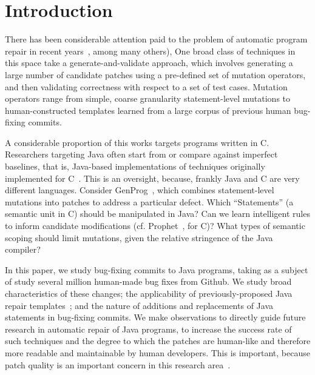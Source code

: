 \documentclass{sig-alternate-05-2015}
\begin{document}
\section{Introduction}

There has been considerable attention paid to the problem of automatic
program repair in recent
years~\cite{kim2013,legoues2012,pan2009,Weimer13, Qi13,
  Mechtaev15,prophet}, among many others),
%
One broad class of techniques in this space take a generate-and-validate
approach, which involves generating a large number of candidate patches using a
pre-defined set of mutation operators, and then validating correctness with
respect to a set of test cases.  Mutation operators range from simple, coarse
granularity statement-level mutations to human-constructed templates learned
from a large corpus of previous human bug-fixing commits.

A considerable proportion of this works targets programs written in C.
Researchers targeting Java often start from or compare against imperfect
baselines, that is, Java-based implementations of techniques originally
implemented for C~\cite{nopol,kim2013}. %
%
This is an oversight, because, frankly Java and C are very different languages.
Consider GenProg~\cite{legoues2012}, which
combines statement-level mutations into patches to address a particular
defect. Which ``Statements'' (a semantic unit in C) should be manipulated in Java?
Can we learn
intelligent rules to inform candidate modifications
(cf. Prophet~\cite{Long2016}, for C)?  What types of semantic scoping
should limit mutations, given the relative stringence of the Java
compiler?

In this paper, we study bug-fixing commits to Java programs, taking as a subject
of study several million human-made bug fixes from Github. We study broad
characteristics of these changes; the applicability of previously-proposed
Java repair templates~\cite{kim2013}; and the nature
of additions and replacements of Java statements in bug-fixing commits. We make
observations to directly guide future research in automatic repair of Java
programs, to increase the success rate of such techniques and the degree to
which the patches are human-like and therefore more readable and maintainable by
human developers. This is important, because patch quality is an important
concern in this research area~\cite{Qi15}.
\end{document}
